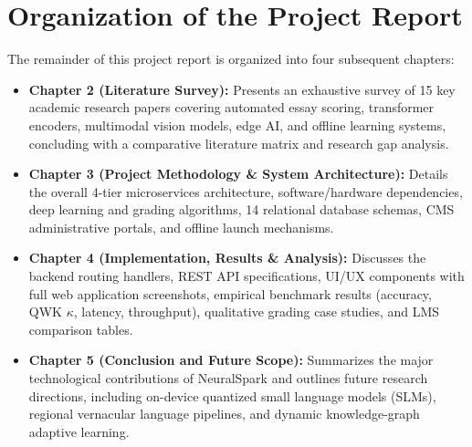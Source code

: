 \section{Organization of the Project Report}
The remainder of this project report is organized into four subsequent chapters:
\begin{itemize}[leftmargin=*]
    \item \textbf{Chapter 2 (Literature Survey):} Presents an exhaustive survey of 15 key academic research papers covering automated essay scoring, transformer encoders, multimodal vision models, edge AI, and offline learning systems, concluding with a comparative literature matrix and research gap analysis.
    \item \textbf{Chapter 3 (Project Methodology \& System Architecture):} Details the overall 4-tier microservices architecture, software/hardware dependencies, deep learning and grading algorithms, 14 relational database schemas, CMS administrative portals, and offline launch mechanisms.
    \item \textbf{Chapter 4 (Implementation, Results \& Analysis):} Discusses the backend routing handlers, REST API specifications, UI/UX components with full web application screenshots, empirical benchmark results (accuracy, QWK $\kappa$, latency, throughput), qualitative grading case studies, and LMS comparison tables.
    \item \textbf{Chapter 5 (Conclusion and Future Scope):} Summarizes the major technological contributions of NeuralSpark and outlines future research directions, including on-device quantized small language models (SLMs), regional vernacular language pipelines, and dynamic knowledge-graph adaptive learning.
\end{itemize}
